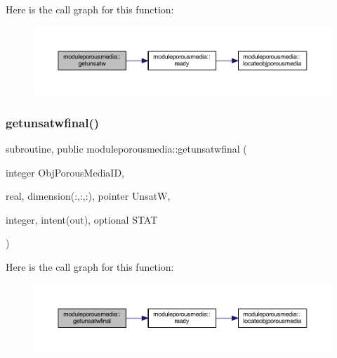 Here is the call graph for this function\+:\nopagebreak
\begin{figure}[H]
\begin{center}
\leavevmode
\includegraphics[width=350pt]{namespacemoduleporousmedia_a34b7f3e33813dc9217457bf375eb5d30_cgraph}
\end{center}
\end{figure}
\mbox{\label{namespacemoduleporousmedia_a3fedd853f5701a32fbd7def6581fa30f}} 
\subsubsection{\texorpdfstring{getunsatwfinal()}{getunsatwfinal()}}
{\footnotesize\ttfamily subroutine, public moduleporousmedia\+::getunsatwfinal (\begin{DoxyParamCaption}\item[{integer}]{Obj\+Porous\+Media\+ID,  }\item[{real, dimension(\+:,\+:,\+:), pointer}]{UnsatW,  }\item[{integer, intent(out), optional}]{S\+T\+AT }\end{DoxyParamCaption})}

Here is the call graph for this function\+:\nopagebreak
\begin{figure}[H]
\begin{center}
\leavevmode
\includegraphics[width=350pt]{namespacemoduleporousmedia_a3fedd853f5701a32fbd7def6581fa30f_cgraph}
\end{center}
\end{figure}
\mbox{\label{namespacemoduleporousmedia_a9423063423e189eb443c264d3302f41d}} 

